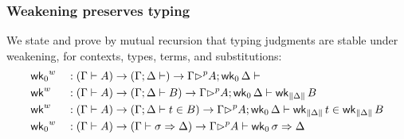 \subsubsection{Weakening preserves typing}
\label{ss:weaken-typing}
We state and prove by mutual recursion that typing judgments are stable under
weakening, for contexts, types, terms, and substitutions:
\begin{alignat*}{5}
  & {\mathsf{wk}_0}^w && : (\Gamma \vdash A)\rightarrow(\Gamma ; \Delta\vdash) \rightarrow
  \Gamma {\rhd}^p A ; \mathsf{wk}_0\, \Delta \vdash \\
  & {\mathsf{wk}}^w && : (\Gamma \vdash A)\rightarrow(\Gamma ; \Delta\vdash B) \rightarrow
  \Gamma {\rhd}^p A ; \mathsf{wk}_0\,\Delta \vdash \mathsf{wk}_{\| \Delta \|}\, B  \\
  & {\mathsf{wk}}^w && : (\Gamma \vdash A)\rightarrow(\Gamma ; \Delta\vdash t\in B) \rightarrow
  \Gamma {\rhd}^p A ; \mathsf{wk}_0\,\Delta \vdash \mathsf{wk}_{\| \Delta \|}\, t \in \mathsf{wk}_{\| \Delta \|}\,B  \\
  & {\mathsf{wk}_0}^w && : (\Gamma \vdash A)\rightarrow(\Gamma \vdash \sigma
  \Rightarrow \Delta) \rightarrow
  \Gamma {\rhd}^p A \vdash \mathsf{wk}_0\, \sigma \Rightarrow \Delta
  \end{alignat*}
